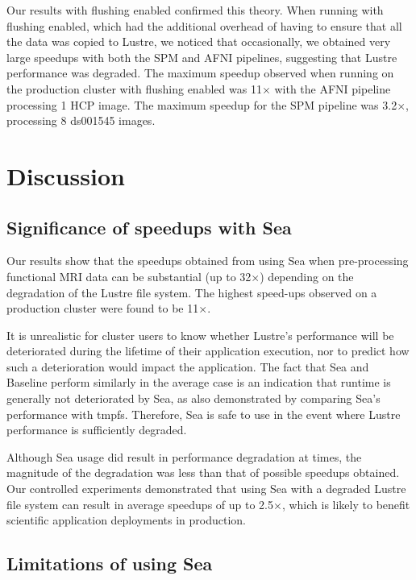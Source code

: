 \documentclass[pdflatex,sn-mathphys-num]{sn-jnl}
\theoremstyle{thmstyleone}%
\theoremstyle{thmstyletwo}%
\theoremstyle{thmstylethree}%
\begin{document}
  Our results with flushing enabled confirmed this theory. When running with
  flushing enabled, which had the additional overhead of having to
  ensure that all the data was copied to Lustre, we noticed that occasionally, we
  obtained very large speedups with both the SPM and AFNI pipelines, suggesting that Lustre
  performance was degraded. The
  maximum speedup observed when running on the production cluster with flushing enabled was
  11$\times$ with the AFNI pipeline processing 1 HCP image. The maximum speedup for the SPM pipeline was
  3.2$\times$, processing 8 ds001545 images.

    
    \section{Discussion}
    \subsection{Significance of speedups with Sea}

    Our results show that the speedups obtained from using Sea when pre-processing functional MRI data can be 
    substantial (up to 32$\times$) depending on the degradation of the Lustre
    file system. The highest speed-ups observed on a production cluster were
    found to be 11$\times$.

    It is unrealistic for cluster users to know whether Lustre's
    performance will be deteriorated during the lifetime of their application
    execution, nor to predict how such a deterioration would impact the
    application. The fact that Sea and Baseline perform similarly in the average
    case is an indication that runtime is generally not deteriorated by Sea, as
    also demonstrated by comparing Sea's performance with tmpfs. Therefore, Sea
    is safe to use in the event where Lustre performance is sufficiently
    degraded.

    Although Sea usage did result in performance degradation at times, the magnitude
    of the degradation was less than that of possible speedups
    obtained. Our controlled experiments demonstrated that using Sea with a
    degraded Lustre file system can result in average speedups of up to
    2.5$\times$, which is likely to benefit scientific application deployments in production.

    \subsection{Limitations of using Sea}
    
\end{document}
